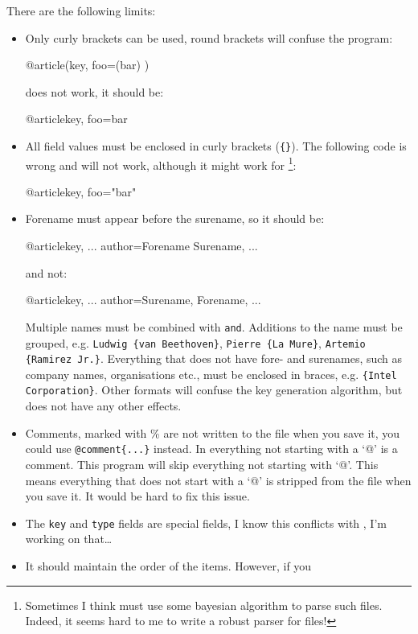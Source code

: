 \documentclass[oneside,10pt]{article}
\begin{document}
There are the following limits:
\begin{itemize}
  \item Only curly brackets can be used, round brackets will confuse the program:
\begin{code}
@article(key,
  foo=(bar)
)
\end{code}
    does not work, it should be:
\begin{code}
@article{key,
  foo={bar}
}
\end{code}
  \item All field values must be enclosed in curly brackets (\verb|{}|). The following
  code is wrong and will not work, although it might work for \BibTeX{}\footnote{Sometimes
  I think \BibTeX{} must use some bayesian \cite{bayes:1763} algorithm to parse
  such files. Indeed, it seems hard to me to write a robust parser for \BibTeX{}
  files!}:
\begin{code}
@article{key,
  foo="bar"
}
\end{code}
  \item Forename must appear before the surename, so it should be:
\begin{code}
@article{key,
  ...
  author={Forename Surename},
  ...
}
\end{code}
  and not:
\begin{code}
@article{key,
  ...
  author={Surename, Forename},
  ...
}
\end{code}
  Multiple names must be combined with \verb|and|. Additions to the name must be
  grouped, e.g. \verb|Ludwig {van Beethoven}|, \verb|Pierre {La Mure}|,
  \verb|Artemio {Ramirez Jr.}|. Everything that does not have fore- and surenames,
  such as company names, organisations etc., must be enclosed in braces, e.g.
  \verb|{Intel Corporation}|. Other formats will confuse the key generation algorithm,
    but does not have any other effects.
  \item Comments, marked with \% are not written to the file when you save it, you
    could use \verb|@comment{...}| instead. In \BibTeX{} everything not starting
    with a `@' is a comment. This program will skip everything not starting with `@'. This
    means everything that does not start with a `@' is stripped from the file when
    you save it. It would be hard to fix this issue.
  \item The \verb|key| and \verb|type| fields are special fields, I know this conflicts
    with \BibTeX{}, I'm working on that\dots{}
  \item It should maintain the order of the items. However, if you

\end{itemize}
\end{document}
